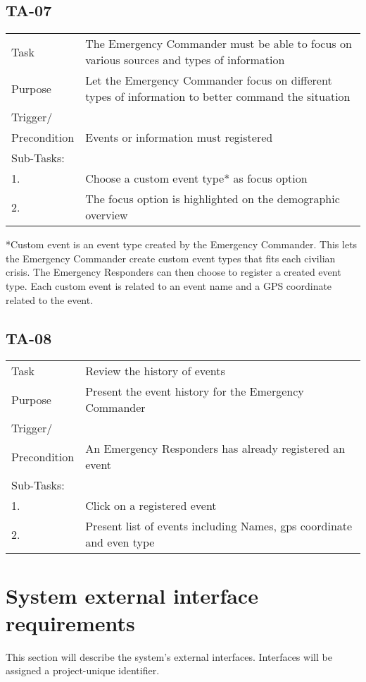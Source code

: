 \newpage
\subsection{TA-07}
\begin{longtable}{| p{2.5cm}  | p{10cm} |  }
	\hline
	Task & The Emergency Commander must be able to focus on various sources and types of information  \\
	Purpose & Let the Emergency Commander focus on different types of information to better command the situation \\
	Trigger/ &  \\ Precondition & Events or information must registered \\
	\hline
	Sub-Tasks: & \\
	1. & Choose a custom event type* as focus option \\
	2. & The focus option is highlighted on the demographic overview \\
	\hline
\end{longtable}

*Custom event is an event type created by the Emergency Commander. This lets the Emergency Commander create custom event types that fits each civilian crisis. The Emergency Responders can then choose to register a created event type. Each custom event is related to an event name and a GPS coordinate related to the event.

\subsection{TA-08}

\begin{longtable}{| p{2.5cm}  | p{10cm} |  }
	\hline
	Task & Review the history of events \\
	Purpose & Present the event history for the Emergency Commander \\
	Trigger/ &  \\ Precondition & An Emergency Responders has already registered an event \\
	\hline
	Sub-Tasks: & \\
	1. & Click on a registered event \\
	2. & Present list of events including Names, gps coordinate and even type  \\
	\hline
\end{longtable}

\FloatBarrier
\newpage

\label{sec_nonFunc1}
\section{System external interface requirements}
This section will describe the system’s external interfaces. Interfaces will be assigned a project-unique identifier. 

